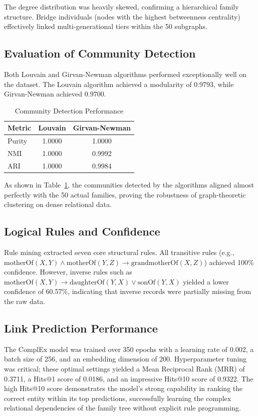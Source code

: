 \documentclass[10pt,twocolumn,letterpaper]{article}
\begin{document}
The degree distribution was heavily skewed, confirming a hierarchical family structure. Bridge individuals (nodes with the highest betweenness centrality) effectively linked multi-generational tiers within the 50 subgraphs.

\subsection{Evaluation of Community Detection}
Both Louvain and Girvan-Newman algorithms performed exceptionally well on the dataset. The Louvain algorithm achieved a modularity of 0.9793, while Girvan-Newman achieved 0.9700. 

\begin{table}[h]
    \centering
    \caption{Community Detection Performance}
    \begin{tabular}{lcc}
        \toprule
        \textbf{Metric} & \textbf{Louvain} & \textbf{Girvan-Newman} \\
        \midrule
        Purity & 1.0000 & 1.0000 \\
        NMI & 1.0000 & 0.9992 \\
        ARI & 1.0000 & 0.9984 \\
        \bottomrule
    \end{tabular}
    \label{tab:community_metrics}
\end{table}
As shown in Table~\ref{tab:community_metrics}, the communities detected by the algorithms aligned almost perfectly with the 50 actual families, proving the robustness of graph-theoretic clustering on dense relational data.

\subsection{Logical Rules and Confidence}
Rule mining extracted seven core structural rules. All transitive rules (e.g., $\text{motherOf}(X,Y) \land \text{motherOf}(Y,Z) \rightarrow \text{grandmotherOf}(X,Z)$) achieved 100\% confidence. However, inverse rules such as $\text{motherOf}(X,Y) \rightarrow \text{daughterOf}(Y,X) \lor \text{sonOf}(Y,X)$ yielded a lower confidence of 60.57\%, indicating that inverse records were partially missing from the raw data.

\subsection{Link Prediction Performance}
The ComplEx model was trained over 350 epochs with a learning rate of 0.002, a batch size of 256, and an embedding dimension of 200. Hyperparameter tuning was critical; these optimal settings yielded a Mean Reciprocal Rank (MRR) of 0.3711, a Hits@1 score of 0.0186, and an impressive Hits@10 score of 0.9322. The high Hits@10 score demonstrates the model's strong capability in ranking the correct entity within its top predictions, successfully learning the complex relational dependencies of the family tree without explicit rule programming.
\end{document}
